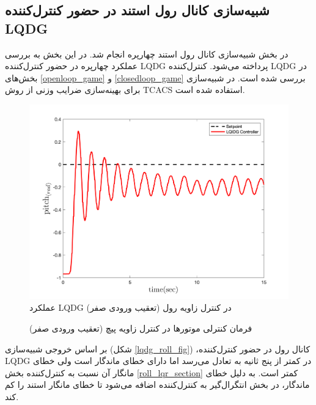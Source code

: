 \subsection{شبیه‌سازی کانال رول استند در حضور کنترل‌کننده LQDG}
در بخش
\label{roll_LQDG}
شبیه‌سازی کانال رول استند چهارپره انجام شد. در این بخش به بررسی عملکرد چهارپره در حضور کنترل‌کننده LQDG پرداخته می‌شود. کنترل‌کننده LQDG در بخش‌های
\ref{openloop_game}
و
\ref{closedloop_game}
بررسی شده است.
 در شبیه‌سازی برای بهینه‌سازی ضرایب وزنی از روش
TCACS \cite{Karimi2010}
استفاده شده است.
\begin{figure}[H]
	\includegraphics[width=.55\linewidth]{../Figures/Calibration/LQDG/Pitch/lqdg_pitch.png}
	\centering
	\caption{عملكرد LQDG در کنترل زاويه رول (تعقیب ورودی صفر)}
\end{figure}

\begin{figure}[H]
	\centering
	\caption{‫‪فرمان کنترلی موتورها در کنترل زاویه پیچ (تعقیب ورودی صفر)}
\end{figure}


بر اساس خروجی شبیه‌سازی (شکل
\ref{lqdg_roll_fig})
،کانال رول در حضور کنترل‌کننده LQDG در کمتر از پنج ثانیه به تعادل می‌رسد اما دارای خطای ماندگار است ولی خطای مانگار آن نسبت به کنترل‌کننده بخش
\ref{roll_lqr_section}
کمتر است. به دلیل خطای ماندگار، در بخش
انتگرال‌گیر به کنترل‌کننده اضافه می‌شود تا خطای مانگار استند را کم کند.
